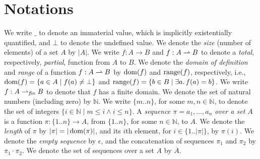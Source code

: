 
\section{Notations}\label{Se:Notations}

We write $\_$ to denote an immaterial value, which is implicitly existentially quantified, 
and $\bot$ to denote the undefined value.
We denote the \emph{size} (number of elements) of a set $A$ by $|A|$.
We write $f: A \to B$ and $f: A \rightharpoonup B$ to denote a \emph{total}, respectively, \emph{partial}, function from $A$ to $B$. We denote the \emph{domain of definition} and \emph{range} of a function $f:A \rightharpoonup  B$ by $\operatorname{dom}(f)$ and $\operatorname{range}(f)$, respectively,
i.e., $\operatorname{dom}(f) = \{a \in A \mid f(a) \neq \bot \}$ and $\operatorname{range}(f)=\{b \in B \mid \exists a.\, f(a)=b\}$.
We write $f:A \rightharpoonup_{\mathit{fin}} B$ to denote that $f$ has a finite  domain.
We denote the set of natural numbers (including zero) by $\mathbb{N}$. We  write
$\{m..n\}$,   for some $m,n \in \mathbb{N}$, to denote the set of integers $\{ i \in \mathbb{N} \mid m \leq i \land i \leq n\}$. 
A \emph{sequence $\pi=a_1,\ldots,a_n$ over a set $A$} is  a function  $\pi:\{1..n\} \to A $, from $\{1..n\}$, for some $n \in \mathbb{N}$, to $A$. 
We denote the \emph{length} of $\pi$ by $|\pi|=|\operatorname{dom}(\pi)|$, and its $i$th element, 
for $i\in \{1..|\pi|\}$, by $\pi(i)$.
We denote the \emph{empty sequence} by $\epsilon$, and the concatenation of sequences $\pi_1$ and $\pi_2$ by %
$\pi_1 \cdot \pi_2$.  
We denote the set of sequences over a set $A$ by $\overline{A}$.
